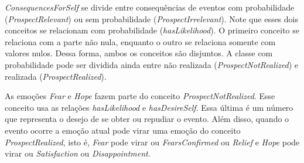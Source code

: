 \emph{ConsequencesForSelf} se divide entre consequências de eventos com
probabilidade (\emph{ProspectRelevant}) ou sem probabilidade
(\emph{ProspectIrrelevant}). Note que esses dois conceitos se
relacionam com probabilidade (\emph{hasLikelihood}). O primeiro conceito se
relaciona com a parte não nula, enquanto o outro se relaciona somente com
valores nulos. Dessa forma, ambos os conceitos são disjuntos. A classe com
probabilidade pode ser dividida ainda entre não
realizada (\emph{ProspectNotRealized}) e realizada (\emph{ProspectRealized}).

As emoções \emph{Fear} e \emph{Hope} fazem parte do conceito
\emph{ProspectNotRealized}. Esse conceito usa as relações \emph{hasLikelihood}
e \emph{hasDesireSelf}. Essa última é um número que
representa o desejo de se obter ou repudiar o evento. Além disso, quando o
evento ocorre a emoção atual pode virar uma emoção do conceito
\emph{ProspectRealized}, isto é, \emph{Fear} pode virar ou
\emph{FearsConfirmed} ou \emph{Relief} e \emph{Hope} pode virar ou
\emph{Satisfaction} ou \emph{Disappointment}.

